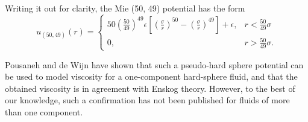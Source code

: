 Writing it out for clarity, the Mie (50, 49) potential has the form
\begin{equation}
    u_{(50, 49)}(r) = 
    \begin{cases}
        50
        \left(\frac{50}{49}\right)
        ^{49}
        \epsilon \left[
            \left(\frac{\sigma}{r}\right)^{50} -
            \left(\frac{\sigma}{r}\right)^{49}
        \right]
        + \epsilon,
            & r < \frac{50}{49} \sigma\\
        0,  & r > \frac{50}{49} \sigma.
    \end{cases}
\end{equation}

Pousaneh and de Wijn \cite{ref:pousaneh:shear_viscosity} 
have shown that such a pseudo-hard sphere potential 
can be used to model viscosity for a one-component hard-sphere fluid, 
and that the obtained viscosity is in agreement with Enskog theory.
However, to the best of our knowledge, such a confirmation has not 
been published for fluids of more than one component. 

